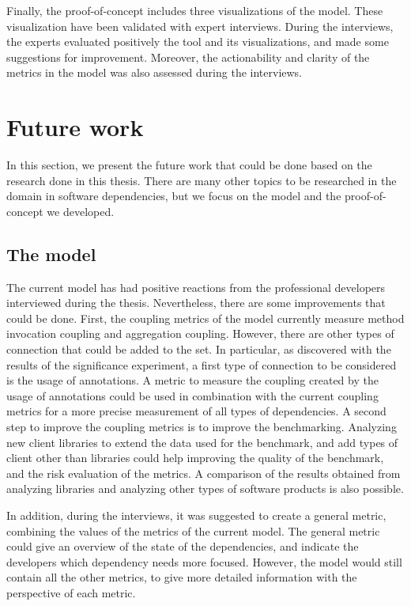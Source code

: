 Finally, the proof-of-concept includes three visualizations of the model. These visualization have been validated with expert interviews. During the interviews, the experts evaluated positively the tool and its visualizations, and made some suggestions for improvement. Moreover, the actionability and clarity of the metrics in the model was also assessed during the interviews.

\section{Future work} \label{sec:future_work}
In this section, we present the future work that could be done based on the research done in this thesis. There are many other topics to be researched in the domain in software dependencies, but we focus on the model and the proof-of-concept we developed.

\subsection{The model}

The current model has had positive reactions from the professional developers interviewed during the thesis. Nevertheless, there are some improvements that could be done. First, the coupling metrics of the model currently measure method invocation coupling and aggregation coupling. However, there are other types of connection that could be added to the set. In particular, as discovered with the results of the significance experiment, a first type of connection to be considered is the usage of annotations. A metric to measure the coupling created by the usage of annotations could be used in combination with the current coupling metrics for a more precise measurement of all types of dependencies. A second step to improve the coupling metrics is to improve the benchmarking. Analyzing new client libraries to extend the data used for the benchmark, and add types of client other than libraries could help improving the quality of the benchmark, and the risk evaluation of the metrics. A comparison of the results obtained from analyzing libraries and analyzing other types of software products is also possible.

In addition, during the interviews, it was suggested to create a general metric, combining the values of the metrics of the current model. The general metric could give an overview of the state of the dependencies, and indicate the developers which dependency needs more focused. However, the model would still contain all the other metrics, to give more detailed information with the perspective of each metric.

